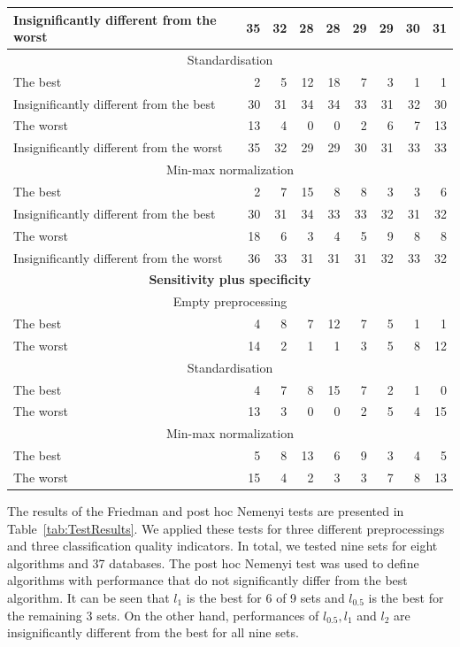\documentclass[entropy,article,submit,moreauthors,pdftex]{Definitions/mdpi}
\begin{document}
\begin{table}[tb]
\begin{tabular}{|l|r|r|r|r|r|r|r|r|}
Insignificantly different from the worst & 35 & 32 & 28 & 28 & 29 & 29 & 30 & 31\\ \hline
\multicolumn{9}{|c|}{Standardisation}\\ \hline
The best & 2 & 5 & 12 & 18 & 7 & 3 & 1 & 1\\ \hline
Insignificantly different from the best & 30 & 31 & 34 & 34 & 33 & 31 & 32 & 30\\ \hline
The worst & 13 & 4 & 0 & 0 & 2 & 6 & 7 & 13\\ \hline
Insignificantly different from the worst & 35 & 32 & 29 & 29 & 30 & 31 & 33 & 33\\ \hline
\multicolumn{9}{|c|}{Min-max normalization}\\ \hline
The best & 2 & 7 & 15 & 8 & 8 & 3 & 3 & 6\\ \hline
Insignificantly different from the best & 30 & 31 & 34 & 33 & 33 & 32 & 31 & 32\\ \hline
The worst & 18 & 6 & 3 & 4 & 5 & 9 & 8 & 8\\ \hline
Insignificantly different from the worst & 36 & 33 & 31 & 31 & 31 & 32 & 33 & 32\\ \hline

\multicolumn{9}{|c|}{\textbf{Sensitivity plus specificity}}\\ \hline
\multicolumn{9}{|c|}{Empty preprocessing}\\ \hline
The best & 4 & 8 & 7 & 12 & 7 & 5 & 1 & 1\\ \hline
The worst & 14 & 2 & 1 & 1 & 3 & 5 & 8 & 12\\ \hline
\multicolumn{9}{|c|}{Standardisation}\\ \hline
The best & 4 & 7 & 8 & 15 & 7 & 2 & 1 & 0\\ \hline
The worst & 13 & 3 & 0 & 0 & 2 & 5 & 4 & 15\\ \hline
\multicolumn{9}{|c|}{Min-max normalization}\\ \hline
The best & 5 & 8 & 13 & 6 & 9 & 3 & 4 & 5\\ \hline
The worst & 15 & 4 & 2 & 3 & 3 & 7 & 8 & 13\\ \hline

\end{tabular}
\label{tab:BestWorst}
\end{table}

The results of the Friedman and post hoc Nemenyi tests are presented in Table~\ref{tab:TestResults}. We applied these tests for three different preprocessings and three classification quality indicators. In total, we tested nine sets for eight algorithms and 37 databases. The post hoc Nemenyi test was used to define algorithms with performance that do not significantly differ from the best algorithm.
It can be seen that $l_{1}$ is the best for 6 of 9 sets and $l_{0.5}$ is the best for the remaining 3 sets. On the other hand, performances of $l_{0.5}, l_1$ and $l_2$ are insignificantly different from the best for all nine sets.
\end{document}
